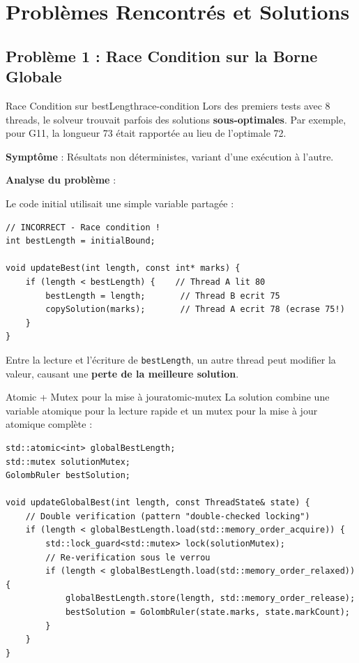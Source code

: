 \documentclass[12pt,a4paper,twoside]{report}
\begin{document}
\section{Problèmes Rencontrés et Solutions}

\subsection{Problème 1 : Race Condition sur la Borne Globale}

\begin{probleme}{Race Condition sur bestLength}{race-condition}
Lors des premiers tests avec 8 threads, le solveur trouvait parfois des solutions \textbf{sous-optimales}. Par exemple, pour G11, la longueur 73 était rapportée au lieu de l'optimale 72.

\textbf{Symptôme} : Résultats non déterministes, variant d'une exécution à l'autre.
\end{probleme}

\textbf{Analyse du problème} :

Le code initial utilisait une simple variable partagée :

\begin{lstlisting}[caption={Code initial avec race condition}]
// INCORRECT - Race condition !
int bestLength = initialBound;

void updateBest(int length, const int* marks) {
    if (length < bestLength) {    // Thread A lit 80
        bestLength = length;       // Thread B ecrit 75
        copySolution(marks);       // Thread A ecrit 78 (ecrase 75!)
    }
}
\end{lstlisting}

Entre la lecture et l'écriture de \texttt{bestLength}, un autre thread peut modifier la valeur, causant une \textbf{perte de la meilleure solution}.

\begin{solution}{Atomic + Mutex pour la mise à jour}{atomic-mutex}
La solution combine une variable atomique pour la lecture rapide et un mutex pour la mise à jour atomique complète :

\begin{lstlisting}
std::atomic<int> globalBestLength;
std::mutex solutionMutex;
GolombRuler bestSolution;

void updateGlobalBest(int length, const ThreadState& state) {
    // Double verification (pattern "double-checked locking")
    if (length < globalBestLength.load(std::memory_order_acquire)) {
        std::lock_guard<std::mutex> lock(solutionMutex);
        // Re-verification sous le verrou
        if (length < globalBestLength.load(std::memory_order_relaxed)) {
            globalBestLength.store(length, std::memory_order_release);
            bestSolution = GolombRuler(state.marks, state.markCount);
        }
    }
}
\end{lstlisting}
\end{solution}
\end{document}
